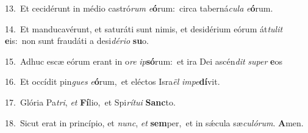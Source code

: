 {\numbfont\textcolor{\numbcolor}{13.}}~Et cecidérunt in médio castró\textit{rum} \textit{e}\-\textbf{ó}rum:~\star circa taberná\-\textit{cu}\-\textit{la} \textit{e}\-\textbf{ó}rum.\par
{\numbfont\textcolor{\numbcolor}{14.}}~Et manducavérunt, et saturáti sunt nimis, et desidérium eórum át\-\textit{tu}\-\textit{lit} \textbf{e}\-is:~\star non sunt fraudáti a desi\-\textit{dé}\-\textit{ri}\textit{o} \textbf{su}\-o.\par
{\numbfont\textcolor{\numbcolor}{15.}}~Adhuc escæ eórum erant in o\textit{re} \textit{ip}\-\textbf{só}rum:~\star et ira Dei ascén\textit{dit} \textit{su}\-\textit{per} \textbf{e}\-os\par
{\numbfont\textcolor{\numbcolor}{16.}}~Et occídit pin\textit{gues} \textit{e}\-\textbf{ó}rum,~\star et eléctos Isra\textit{ël} \textit{im}\-\textit{pe}\textbf{dí}vit.\par
{\numbfont\textcolor{\numbcolor}{17.}}~Glória Pa\-\textit{tri}\-, \textit{et} \textbf{Fí}\-lio,~\star et Spi\-\textit{rí}\-\textit{tu}\textit{i} \textbf{Sanc}\-to.\par
{\numbfont\textcolor{\numbcolor}{18.}}~Sicut erat in princípio, et \textit{nunc}\-, \textit{et} \textbf{sem}\-per,~\star et in sǽcula sæ\-\textit{cu}\-\textit{ló}\textit{rum}. \textbf{A}\-men.\par
